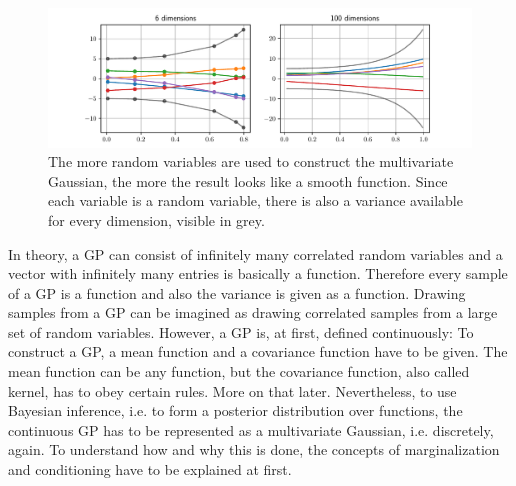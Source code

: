 \documentclass[%
  a4paper,oneside,%
  11pt,%
  smallchapters,
  style=printdev,
  extramargin,
  green,%
  rgb, <cmyk>
  ]{tubsbook}
\begin{document}
\begin{figure}[!ht]
\begin{center}
\includegraphics[width=1\textwidth]{pics/multivarGP}
\caption{The more random variables are used to construct the multivariate Gaussian, the more the result looks like a smooth function. Since each variable is a random variable, there is also a variance available for every dimension, visible in grey.}
\label{fig:multiGP}
\end{center}
\end{figure}
%
In theory, a GP can consist of infinitely many correlated random variables and a vector with infinitely many entries is basically a function. Therefore every sample of a GP is a function and also the variance is given as a function. Drawing samples from a GP can be imagined as drawing correlated samples from a large set of random variables. However, a GP is, at first, defined continuously: To construct a GP, a mean function and a covariance function have to be given. The mean function can be any function, but the covariance function, also called kernel, has to obey certain rules. More on that later.  Nevertheless, to use Bayesian inference, i.e. to form a posterior distribution over functions, the continuous GP has to be represented as a multivariate Gaussian, i.e. discretely, again. To understand how and why this is done, the concepts of marginalization and conditioning have to be explained at first.
\end{document}
